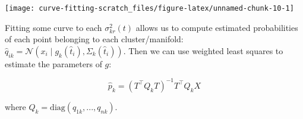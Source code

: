 \documentclass[
  11pt,
]{article}
\begin{document}
\begin{center}\texttt{[image: curve-fitting-scratch\_files/figure-latex/unnamed-chunk-10-1]} \end{center}

Fitting some curve to each \(\sigma_{kr}^2(t)\) allows us to compute
estimated probabilities of each point belonging to each
cluster/manifold:
\(\hat{q}_{ik} = \mathcal{N}(x_i \mid g_k(\hat{t}_i), \Sigma_k(\hat{t}_i))\).
Then we can use weighted least squares to estimate the parameters of
\(g\):

\[\hat{p}_k = (T^\top Q_k T)^{-1} T^\top Q_k X\]

where \(Q_k = \mathrm{diag}(q_{1k}, ..., q_{nk})\).

  
\end{document}

